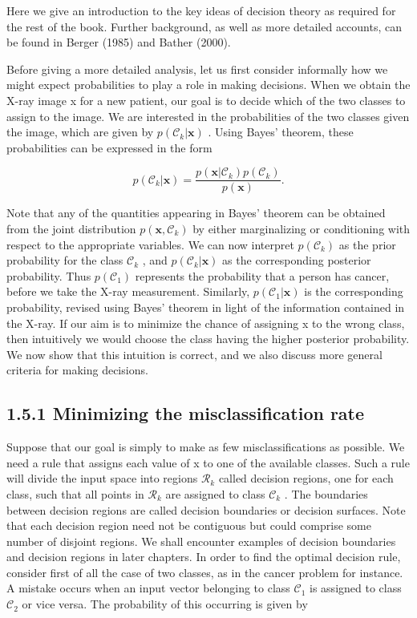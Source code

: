 \documentclass[
  10
]{article}
\begin{document}
Here we give an introduction to the key ideas of decision theory as
required for the rest of the book. Further background, as well as more
detailed accounts, can be found in Berger (1985) and Bather (2000).

Before giving a more detailed analysis, let us first consider informally
how we might expect probabilities to play a role in making decisions.
When we obtain the X-ray image x for a new patient, our goal is to
decide which of the two classes to assign to the image. We are
interested in the probabilities of the two classes given the image,
which are given by \(p ( \mathcal { C } _ { k } \vert \mathbf { x } )\)
. Using Bayes' theorem, these probabilities can be expressed in the form

\[
p (\mathcal {C} _ {k} | \mathbf {x}) = \frac {p (\mathbf {x} | \mathcal {C} _ {k}) p (\mathcal {C} _ {k})}{p (\mathbf {x})}.\tag{1.77}
\]

Note that any of the quantities appearing in Bayes' theorem can be
obtained from the joint distribution
\(p ( \mathbf { x } , \mathcal { C } _ { k } )\) by either marginalizing
or conditioning with respect to the appropriate variables. We can now
interpret \(p ( \mathcal { C } _ { k } )\) as the prior probability for
the class \(\mathcal { C } _ { k }\) , and
\(p ( \mathcal { C } _ { k } \vert \mathbf { x } )\) as the
corresponding posterior probability. Thus
\(p ( \mathcal { C } _ { 1 } )\) represents the probability that a
person has cancer, before we take the X-ray measurement. Similarly,
\(p ( \mathcal { C } _ { 1 } | \mathbf { x } )\) is the corresponding
probability, revised using Bayes' theorem in light of the information
contained in the X-ray. If our aim is to minimize the chance of
assigning x to the wrong class, then intuitively we would choose the
class having the higher posterior probability. We now show that this
intuition is correct, and we also discuss more general criteria for
making decisions.

\subsection{1.5.1 Minimizing the misclassification
rate}\label{minimizing-the-misclassification-rate}

Suppose that our goal is simply to make as few misclassifications as
possible. We need a rule that assigns each value of x to one of the
available classes. Such a rule will divide the input space into regions
\(\mathcal { R } _ { k }\) called decision regions, one for each class,
such that all points in \(\mathcal { R } _ { k }\) are assigned to class
\(\mathcal { C } _ { k }\) . The boundaries between decision regions are
called decision boundaries or decision surfaces. Note that each decision
region need not be contiguous but could comprise some number of disjoint
regions. We shall encounter examples of decision boundaries and decision
regions in later chapters. In order to find the optimal decision rule,
consider first of all the case of two classes, as in the cancer problem
for instance. A mistake occurs when an input vector belonging to class
\(\mathcal { C } _ { 1 }\) is assigned to class
\(\mathcal { C } _ { 2 }\) or vice versa. The probability of this
occurring is given by
\end{document}
